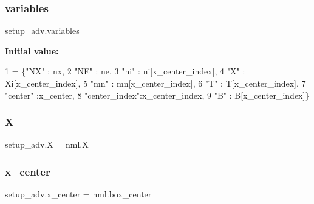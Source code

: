 \mbox{\label{namespacesetup__adv_a5aa2f642ac3119eb75b9a40bda824c20}} 
\subsubsection{\texorpdfstring{variables}{variables}}
{\footnotesize\ttfamily setup\+\_\+adv.\+variables}

{\bfseries Initial value\+:}
\begin{DoxyCode}
1 =  \{\textcolor{stringliteral}{"NX"}       : nx,
2              \textcolor{stringliteral}{"NE"}       : ne,
3              \textcolor{stringliteral}{"ni"}       : ni[x\_center\_index],
4              \textcolor{stringliteral}{"X"}        : Xi[x\_center\_index],
5              \textcolor{stringliteral}{"mn"}       : mn[x\_center\_index],
6              \textcolor{stringliteral}{"T"}        : T[x\_center\_index],
7              \textcolor{stringliteral}{"center"}   :x\_center,
8              \textcolor{stringliteral}{"center\_index"}:x\_center\_index,
9              \textcolor{stringliteral}{"B"}        : B[x\_center\_index]\}
\end{DoxyCode}
\mbox{\label{namespacesetup__adv_a6d9cd2ec966fe51739f30fabc346a12b}} 
\subsubsection{\texorpdfstring{X}{X}}
{\footnotesize\ttfamily setup\+\_\+adv.\+X = nml.\+X}

\mbox{\label{namespacesetup__adv_affa314aa4c3619c6df4ab64ad91ddfe4}} 
\subsubsection{\texorpdfstring{x\+\_\+center}{x\_center}}
{\footnotesize\ttfamily setup\+\_\+adv.\+x\+\_\+center = nml.\+box\+\_\+center}

\mbox{\label{namespacesetup__adv_aa4b9207992c9429f9848abddc21a9761}} 
